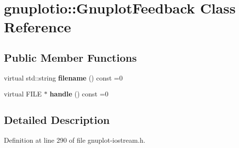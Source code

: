 \hypertarget{classgnuplotio_1_1_gnuplot_feedback}{}\section{gnuplotio\+:\+:Gnuplot\+Feedback Class Reference}
\label{classgnuplotio_1_1_gnuplot_feedback}
\subsection*{Public Member Functions}
\begin{DoxyCompactItemize}
\item 
virtual std\+::string {\bfseries filename} () const =0\hypertarget{classgnuplotio_1_1_gnuplot_feedback_a081d4d59ffd81e2322c07c0a802e1307}{}\label{classgnuplotio_1_1_gnuplot_feedback_a081d4d59ffd81e2322c07c0a802e1307}

\item 
virtual F\+I\+LE $\ast$ {\bfseries handle} () const =0\hypertarget{classgnuplotio_1_1_gnuplot_feedback_a13ae87ba489bfbe87f64b8b54e8a4563}{}\label{classgnuplotio_1_1_gnuplot_feedback_a13ae87ba489bfbe87f64b8b54e8a4563}

\end{DoxyCompactItemize}


\subsection{Detailed Description}


Definition at line 290 of file gnuplot-\/iostream.\+h.

